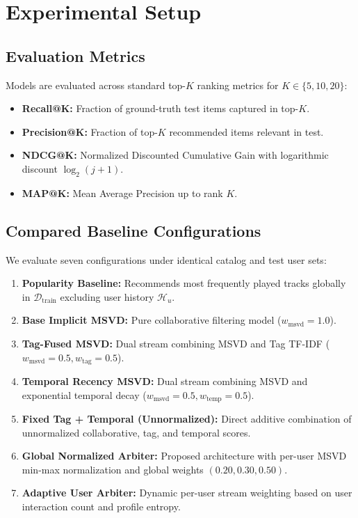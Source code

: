 \documentclass[conference]{IEEEtran}
\begin{document}
\section{Experimental Setup}
\subsection{Evaluation Metrics}
Models are evaluated across standard top-$K$ ranking metrics for $K \in \{5, 10, 20\}$:
\begin{itemize}
    \item \textbf{Recall@K:} Fraction of ground-truth test items captured in top-$K$.
    \item \textbf{Precision@K:} Fraction of top-$K$ recommended items relevant in test.
    \item \textbf{NDCG@K:} Normalized Discounted Cumulative Gain with logarithmic discount $\log_2(j + 1)$.
    \item \textbf{MAP@K:} Mean Average Precision up to rank $K$.
\end{itemize}

\subsection{Compared Baseline Configurations}
We evaluate seven configurations under identical catalog and test user sets:
\begin{enumerate}
    \item \textbf{Popularity Baseline:} Recommends most frequently played tracks globally in $\mathcal{D}_{\text{train}}$ excluding user history $\mathcal{H}_u$.
    \item \textbf{Base Implicit MSVD:} Pure collaborative filtering model ($w_{\text{msvd}}=1.0$).
    \item \textbf{Tag-Fused MSVD:} Dual stream combining MSVD and Tag TF-IDF ($w_{\text{msvd}}=0.5, w_{\text{tag}}=0.5$).
    \item \textbf{Temporal Recency MSVD:} Dual stream combining MSVD and exponential temporal decay ($w_{\text{msvd}}=0.5, w_{\text{temp}}=0.5$).
    \item \textbf{Fixed Tag + Temporal (Unnormalized):} Direct additive combination of unnormalized collaborative, tag, and temporal scores.
    \item \textbf{Global Normalized Arbiter:} Proposed architecture with per-user MSVD min-max normalization and global weights $(0.20, 0.30, 0.50)$.
    \item \textbf{Adaptive User Arbiter:} Dynamic per-user stream weighting based on user interaction count and profile entropy.
\end{enumerate}
\end{document}
